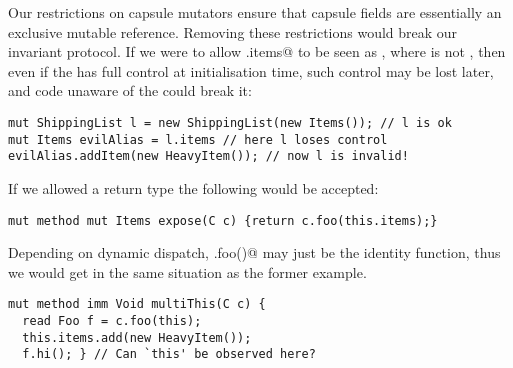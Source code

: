 Our restrictions on capsule mutators ensure that capsule fields are essentially an exclusive mutable reference.
Removing these restrictions would break our invariant protocol.
If we were to allow \Q@x.items@ to be seen as \Q@mut@, where \Q@x@ is not \Q@this@, then  even if the \Q@ShippingList@ has full control at initialisation time, such control may be lost later, and code unaware of the \Q@ShippingList@ could break it:
\begin{lstlisting}
mut ShippingList l = new ShippingList(new Items()); // l is ok
mut Items evilAlias = l.items // here l loses control
evilAlias.addItem(new HeavyItem()); // now l is invalid!
\end{lstlisting}

If we allowed a \Q@mut@ return type the following would be accepted:
\begin{lstlisting}
mut method mut Items expose(C c) {return c.foo(this.items);}
\end{lstlisting}

Depending on dynamic dispatch, \Q@c.foo()@ may just be the identity function, thus
we would get in the same situation as the former example.




\begin{lstlisting}
mut method imm Void multiThis(C c) {
  read Foo f = c.foo(this);
  this.items.add(new HeavyItem());
  f.hi(); } // Can `this' be observed here?
\end{lstlisting}

